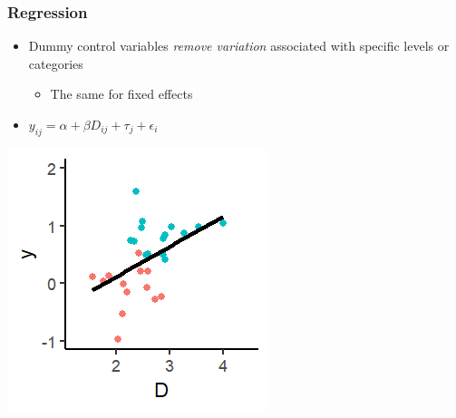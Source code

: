\documentclass[xcolor=x11names,compress]{beamer}\usepackage[]{graphicx}\usepackage[]{color}
\makeatletter
\def\maxwidth{ %
  \ifdim\Gin@nat@width>\linewidth
    \linewidth
  \else
    \Gin@nat@width
  \fi
}
\newenvironment{knitrout}{}{} %
\renewcommand{\(}{\begin{columns}}
\renewcommand{\)}{\end{columns}}
\newcommand{\<}[1]{\begin{column}{#1}}
\renewcommand{\>}{\end{column}}
\makeatother
\begin{document}
\begin{frame}
\frametitle{Regression}
\begin{itemize}
\item Dummy control variables \textit{remove variation} associated with specific levels or categories
\begin{itemize}
\item The same for fixed effects
\end{itemize}
\item $y_{ij} = \alpha + \beta D_{ij} + \tau_j + \epsilon_i$
\end{itemize}
\begin{multicols}{2}
\begin{knitrout}
\color{fgcolor}
\includegraphics[width=\maxwidth]{figure/graph_ols_FE2-1} 

\end{knitrout}
\columnbreak
\end{multicols}
\end{frame}
\end{document}
